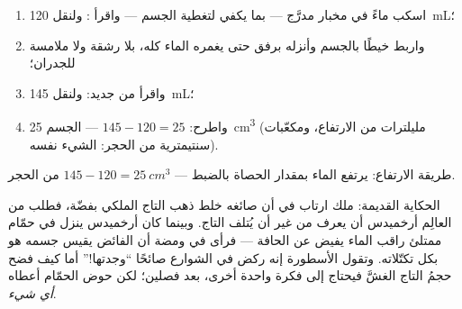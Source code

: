 \begin{method}\label{met:g6:mass-and-volume:rise}
\begin{enumerate}
  \item اسكب ماءً في مخبار مدرَّج --- بما يكفي لتغطية الجسم ---
        واقرأ : ولنقل \qty{120}{mL}؛
  \item واربط خيطًا بالجسم وأنزله برفق حتى يغمره الماء كله، بلا
        رشقة ولا ملامسة للجدران؛
  \item واقرأ من جديد: ولنقل \qty{145}{mL}؛
  \item واطرح: $145 - 120 = 25$ ---  الجسم \qty{25}{cm^3}
        (مليلترات من الارتفاع، ومكعّبات سنتيمترية من الحجر:
        الشيء نفسه).
\end{enumerate}
\end{method}

\begin{omfigure}

{\small طريقة الارتفاع: يرتفع الماء بمقدار  الحصاة بالضبط ---
$145 - 120 = \qty{25}{cm^3}$ من الحجر.}
\end{omfigure}

\begin{example}\label{ex:g6:mass-and-volume:archimedes}
الحكاية القديمة: ملك ارتاب في أن صائغه خلط ذهب التاج الملكي
بفضّة، فطلب من العالِم أرخميدس أن يعرف من غير أن يُتلف التاج.
وبينما كان أرخميدس ينزل في حمّام ممتلئ راقب الماء يفيض عن
الحافة --- فرأى في ومضة أن الفائض يقيس  جسمه هو بكل تكتّلاته.
وتقول الأسطورة إنه ركض في الشوارع صائحًا ``وجدتها!'' أما كيف
فضح حجمُ التاج الغشَّ فيحتاج إلى فكرة واحدة أخرى، بعد فصلين؛
لكن حوض الحمّام أعطاه  \emph{أي شيء}.
\end{example}

